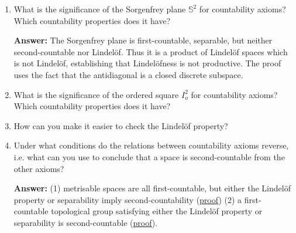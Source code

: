 \begin{enumerate}
    \item What is the significance of the Sorgenfrey plane \( \mathbb{S}^2 \) for countability axioms? Which countability properties does it have?

        \textbf{Answer:}  The Sorgenfrey plane is first-countable, separable, but neither second-countable nor Lindel\"of. Thus it is a product of Lindel\"of spaces which is not Lindel\"of, establishing that Lindel\"ofness is not productive. The proof uses the fact that the antidiagonal is a closed discrete subspace.

    \item What is the significance of the ordered square \( I_o^2 \) for countability axioms? Which countability properties does it have?
    \item How can you make it easier to check the Lindel\"of property?
    \item Under what conditions do the relations between countability axioms reverse, i.e. what can you use to conclude that a space is second-countable from the other axioms?
    
        \textbf{Answer:} (1) metrisable spaces are all first-countable, but either the Lindel\"of property or separability imply second-countability (\hyperlink{MetrisableSpaceCountabilityProperties}{proof}) (2) a first-countable topological group satisfying either the Lindel\"of property or separability is second-countable (\hyperlink{MunkresP30.18}{proof}).
\end{enumerate}


